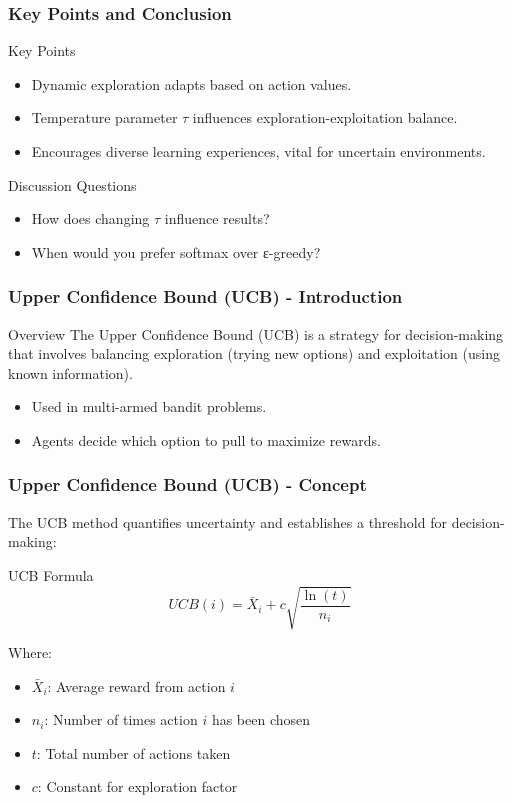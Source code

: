 \documentclass[aspectratio=169]{beamer}
\begin{document}
\begin{frame}[fragile]
    \frametitle{Key Points and Conclusion}
    \begin{block}{Key Points}
        \begin{itemize}
            \item Dynamic exploration adapts based on action values.
            \item Temperature parameter \( \tau \) influences exploration-exploitation balance.
            \item Encourages diverse learning experiences, vital for uncertain environments.
        \end{itemize}
    \end{block}
    \begin{block}{Discussion Questions}
        \begin{itemize}
            \item How does changing \( \tau \) influence results?
            \item When would you prefer softmax over ε-greedy?
        \end{itemize}
    \end{block}
\end{frame}

\begin{frame}[fragile]
    \frametitle{Upper Confidence Bound (UCB) - Introduction}
    \begin{block}{Overview}
        The Upper Confidence Bound (UCB) is a strategy for decision-making that involves balancing exploration (trying new options) and exploitation (using known information).
    \end{block}
    \begin{itemize}
        \item Used in multi-armed bandit problems.
        \item Agents decide which option to pull to maximize rewards.
    \end{itemize}
\end{frame}

\begin{frame}[fragile]
    \frametitle{Upper Confidence Bound (UCB) - Concept}
    The UCB method quantifies uncertainty and establishes a threshold for decision-making:
    
    \begin{block}{UCB Formula}
        \begin{equation}
            UCB(i) = \bar{X}_i + c \sqrt{\frac{\ln(t)}{n_i}}
        \end{equation}
    \end{block}
    Where:
    \begin{itemize}
        \item $\bar{X}_i$: Average reward from action $i$
        \item $n_i$: Number of times action $i$ has been chosen
        \item $t$: Total number of actions taken
        \item $c$: Constant for exploration factor
    \end{itemize}
\end{frame}
\end{document}
